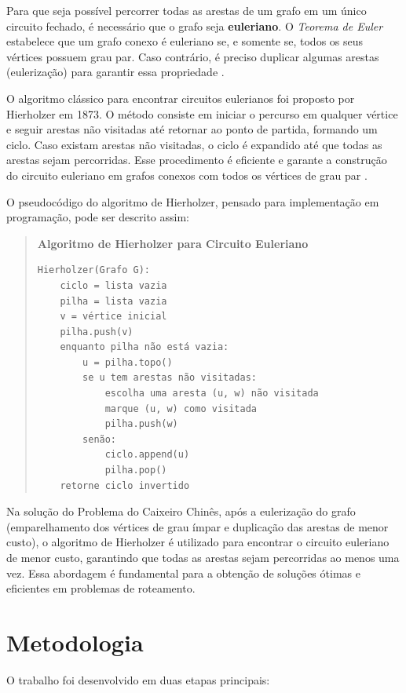 \documentclass[12pt]{article}
\begin{document}
Para que seja possível percorrer todas as arestas de um grafo em um único circuito fechado, é necessário que o grafo seja \textbf{euleriano}. O \textit{Teorema de Euler} estabelece que um grafo conexo é euleriano se, e somente se, todos os seus vértices possuem grau par. Caso contrário, é preciso duplicar algumas arestas (eulerização) para garantir essa propriedade \cite{boaventura2002grafos}.


O algoritmo clássico para encontrar circuitos eulerianos foi proposto por Hierholzer em 1873. O método consiste em iniciar o percurso em qualquer vértice e seguir arestas não visitadas até retornar ao ponto de partida, formando um ciclo. Caso existam arestas não visitadas, o ciclo é expandido até que todas as arestas sejam percorridas. Esse procedimento é eficiente e garante a construção do circuito euleriano em grafos conexos com todos os vértices de grau par \cite{hierholzer1873}.


O pseudocódigo do algoritmo de Hierholzer, pensado para implementação em programação, pode ser descrito assim:

\begin{quote}
	\textbf{Algoritmo de Hierholzer para Circuito Euleriano}

\begin{verbatim}
Hierholzer(Grafo G):
    ciclo = lista vazia
    pilha = lista vazia
    v = vértice inicial
    pilha.push(v)
    enquanto pilha não está vazia:
        u = pilha.topo()
        se u tem arestas não visitadas:
            escolha uma aresta (u, w) não visitada
            marque (u, w) como visitada
            pilha.push(w)
        senão:
            ciclo.append(u)
            pilha.pop()
    retorne ciclo invertido
\end{verbatim}
\end{quote}

Na solução do Problema do Caixeiro Chinês, após a eulerização do grafo (emparelhamento dos vértices de grau ímpar e duplicação das arestas de menor custo), o algoritmo de Hierholzer é utilizado para encontrar o circuito euleriano de menor custo, garantindo que todas as arestas sejam percorridas ao menos uma vez. Essa abordagem é fundamental para a obtenção de soluções ótimas e eficientes em problemas de roteamento.

\section{Metodologia}

O trabalho foi desenvolvido em duas etapas principais:
\end{document}
